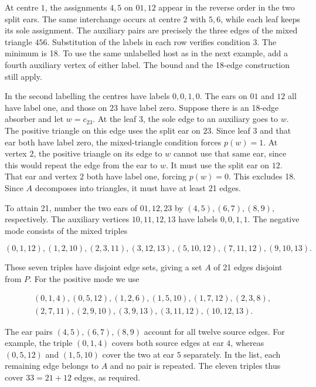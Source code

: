 \documentclass[english,11pt,a4paper]{article}
\begin{document}
At centre \(1\), the assignments \(4,5\) on \(01,12\) appear in the reverse order in the two split ears. The same interchange occurs at centre \(2\) with \(5,6\), while each leaf keeps its sole assignment. The auxiliary pairs are precisely the three edges of the mixed triangle \(456\). Substitution of the labels in each row verifies condition 3. The minimum is 18. To use the same unlabelled host as in the next example, add a fourth auxiliary vertex of either label. The bound and the 18-edge construction still apply.

In the second labelling the centres have labels \(0,0,1,0\). The ears on \(01\) and \(12\) all have label one, and those on \(23\) have label zero. Suppose there is an 18-edge absorber and let \(w=c_{23}\). At the leaf \(3\), the sole edge to an auxiliary goes to \(w\). The positive triangle on this edge uses the split ear on \(23\). Since leaf \(3\) and that ear both have label zero, the mixed-triangle condition forces \(p(w)=1\). At vertex \(2\), the positive triangle on its edge to \(w\) cannot use that same ear, since this would repeat the edge from the ear to \(w\). It must use the split ear on \(12\). That ear and vertex \(2\) both have label one, forcing \(p(w)=0\). This excludes 18. Since \(A\) decomposes into triangles, it must have at least 21 edges.

To attain 21, number the two ears of \(01,12,23\) by \((4,5),(6,7),(8,9)\), respectively. The auxiliary vertices \(10,11,12,13\) have labels \(0,0,1,1\). The negative mode consists of the mixed triples

\[
(0,1,12), (1,2,10), (2,3,11), (3,12,13), (5,10,12), (7,11,12), (9,10,13).
\]

These seven triples have disjoint edge sets, giving a set \(A\) of 21 edges disjoint from \(P\). For the positive mode we use

\[
\begin{gathered}
(0,1,4), (0,5,12), (1,2,6), (1,5,10), (1,7,12), (2,3,8),\\
(2,7,11), (2,9,10), (3,9,13), (3,11,12), (10,12,13).
\end{gathered}
\]

The ear pairs \((4,5),(6,7),(8,9)\) account for all twelve source edges. For example, the triple \((0,1,4)\) covers both source edges at ear \(4\), whereas \((0,5,12)\) and \((1,5,10)\) cover the two at ear \(5\) separately. In the list, each remaining edge belongs to \(A\) and no pair is repeated. The eleven triples thus cover \(33=21+12\) edges, as required.
\end{document}
